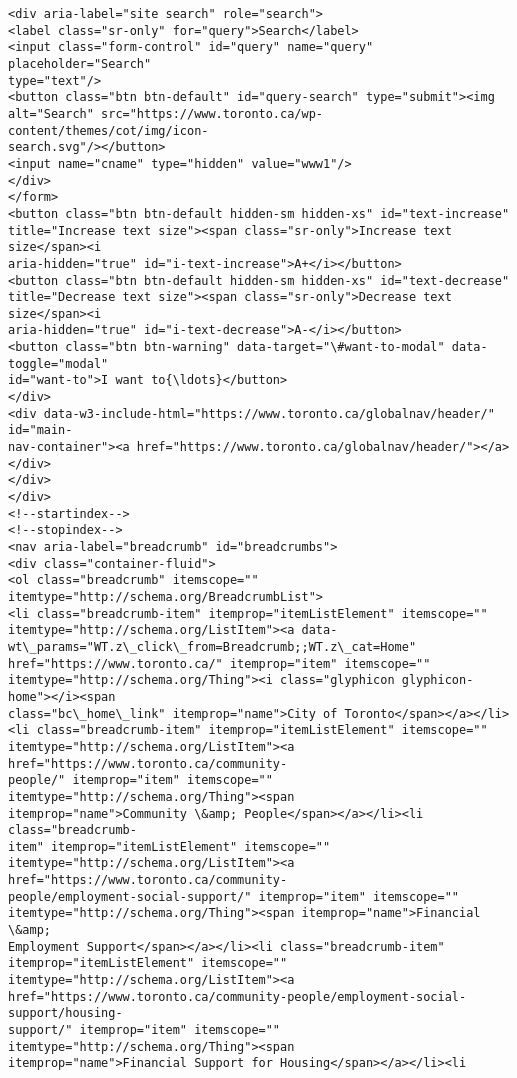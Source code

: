 \documentclass[11pt]{article}
\begin{document}
\begin{Verbatim}[commandchars=\\\{\}]
<div aria-label="site search" role="search">
<label class="sr-only" for="query">Search</label>
<input class="form-control" id="query" name="query" placeholder="Search"
type="text"/>
<button class="btn btn-default" id="query-search" type="submit"><img
alt="Search" src="https://www.toronto.ca/wp-content/themes/cot/img/icon-
search.svg"/></button>
<input name="cname" type="hidden" value="www1"/>
</div>
</form>
<button class="btn btn-default hidden-sm hidden-xs" id="text-increase"
title="Increase text size"><span class="sr-only">Increase text size</span><i
aria-hidden="true" id="i-text-increase">A+</i></button>
<button class="btn btn-default hidden-sm hidden-xs" id="text-decrease"
title="Decrease text size"><span class="sr-only">Decrease text size</span><i
aria-hidden="true" id="i-text-decrease">A-</i></button>
<button class="btn btn-warning" data-target="\#want-to-modal" data-toggle="modal"
id="want-to">I want to{\ldots}</button>
</div>
<div data-w3-include-html="https://www.toronto.ca/globalnav/header/" id="main-
nav-container"><a href="https://www.toronto.ca/globalnav/header/"></a></div>
</div>
</div>
<!--startindex-->
<!--stopindex-->
<nav aria-label="breadcrumb" id="breadcrumbs">
<div class="container-fluid">
<ol class="breadcrumb" itemscope="" itemtype="http://schema.org/BreadcrumbList">
<li class="breadcrumb-item" itemprop="itemListElement" itemscope=""
itemtype="http://schema.org/ListItem"><a data-
wt\_params="WT.z\_click\_from=Breadcrumb;;WT.z\_cat=Home"
href="https://www.toronto.ca/" itemprop="item" itemscope=""
itemtype="http://schema.org/Thing"><i class="glyphicon glyphicon-home"></i><span
class="bc\_home\_link" itemprop="name">City of Toronto</span></a></li>
<li class="breadcrumb-item" itemprop="itemListElement" itemscope=""
itemtype="http://schema.org/ListItem"><a href="https://www.toronto.ca/community-
people/" itemprop="item" itemscope="" itemtype="http://schema.org/Thing"><span
itemprop="name">Community \&amp; People</span></a></li><li class="breadcrumb-
item" itemprop="itemListElement" itemscope=""
itemtype="http://schema.org/ListItem"><a href="https://www.toronto.ca/community-
people/employment-social-support/" itemprop="item" itemscope=""
itemtype="http://schema.org/Thing"><span itemprop="name">Financial \&amp;
Employment Support</span></a></li><li class="breadcrumb-item"
itemprop="itemListElement" itemscope="" itemtype="http://schema.org/ListItem"><a
href="https://www.toronto.ca/community-people/employment-social-support/housing-
support/" itemprop="item" itemscope="" itemtype="http://schema.org/Thing"><span
itemprop="name">Financial Support for Housing</span></a></li><li

\end{Verbatim}
\end{document}
